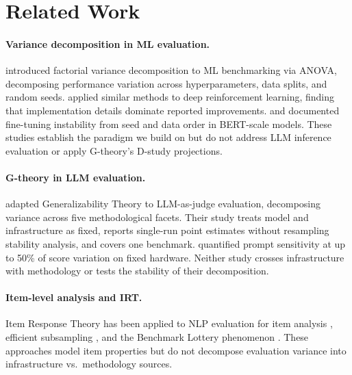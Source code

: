 \documentclass[11pt]{article}
\begin{document}
\section{Related Work}

\paragraph{Variance decomposition in ML evaluation.}
\citet{bouthillier2021accounting} introduced factorial variance decomposition to ML benchmarking via ANOVA, decomposing performance variation across hyperparameters, data splits, and random seeds.
\citet{henderson2018deep} applied similar methods to deep reinforcement learning, finding that implementation details dominate reported improvements.
\citet{dodge2020fine} and \citet{sellam2022multiBERTs} documented fine-tuning instability from seed and data order in BERT-scale models.
These studies establish the paradigm we build on but do not address LLM inference evaluation or apply G-theory's D-study projections.

\paragraph{G-theory in LLM evaluation.}
\citet{mesting2026generalizability} adapted Generalizability Theory to LLM-as-judge evaluation, decomposing variance across five methodological facets.
Their study treats model and infrastructure as fixed, reports single-run point estimates without resampling stability analysis, and covers one benchmark.
\citet{brittlebench2026} quantified prompt sensitivity at up to 50\% of score variation on fixed hardware.
Neither study crosses infrastructure with methodology or tests the stability of their decomposition.

\paragraph{Item-level analysis and IRT.}
Item Response Theory has been applied to NLP evaluation for item analysis \citep{lalor2019learning, rodriguez2021evaluation, vania2021comparing}, efficient subsampling \citep{polo2024tinybenchmarks, perlitz2023efficient}, and the Benchmark Lottery phenomenon \citep{dehghani2021benchmark}.
These approaches model item properties but do not decompose evaluation variance into infrastructure vs.\ methodology sources.
\end{document}
